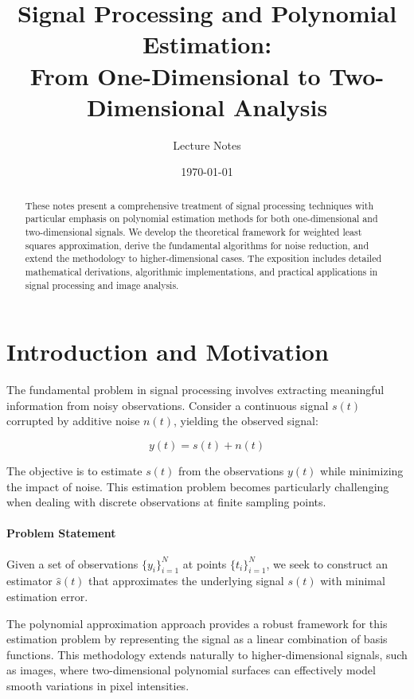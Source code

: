 \documentclass[12pt]{article}
\title{Signal Processing and Polynomial Estimation: \\
From One-Dimensional to Two-Dimensional Analysis}
\author{Lecture Notes}
\date{\today}
\begin{document}
\maketitle

\begin{abstract}
    These notes present a comprehensive treatment of signal processing techniques with particular emphasis on polynomial estimation methods for both one-dimensional and two-dimensional signals. We develop the theoretical framework for weighted least squares approximation, derive the fundamental algorithms for noise reduction, and extend the methodology to higher-dimensional cases. The exposition includes detailed mathematical derivations, algorithmic implementations, and practical applications in signal processing and image analysis.
\end{abstract}

\tableofcontents
\newpage

\section{Introduction and Motivation}

The fundamental problem in signal processing involves extracting meaningful information from noisy observations. Consider a continuous signal $s(t)$ corrupted by additive noise $n(t)$, yielding the observed signal:

\begin{equation}
    y(t) = s(t) + n(t)
\end{equation}

The objective is to estimate $s(t)$ from the observations $y(t)$ while minimizing the impact of noise. This estimation problem becomes particularly challenging when dealing with discrete observations at finite sampling points.

\paragraph{Problem Statement} Given a set of observations $\{y_i\}_{i=1}^N$ at points $\{t_i\}_{i=1}^N$, we seek to construct an estimator $\hat{s}(t)$ that approximates the underlying signal $s(t)$ with minimal estimation error.


The polynomial approximation approach provides a robust framework for this estimation problem by representing the signal as a linear combination of basis functions. This methodology extends naturally to higher-dimensional signals, such as images, where two-dimensional polynomial surfaces can effectively model smooth variations in pixel intensities.
\end{document}
